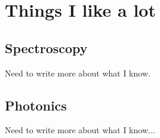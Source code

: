 \documentclass{article}
\begin{document}
\section{Things I like a lot}




\subsection{Spectroscopy}

Need to write more about what I know.

\subsection{Photonics}

Need to write more about what I know...

\subsection{}
\end{document}
